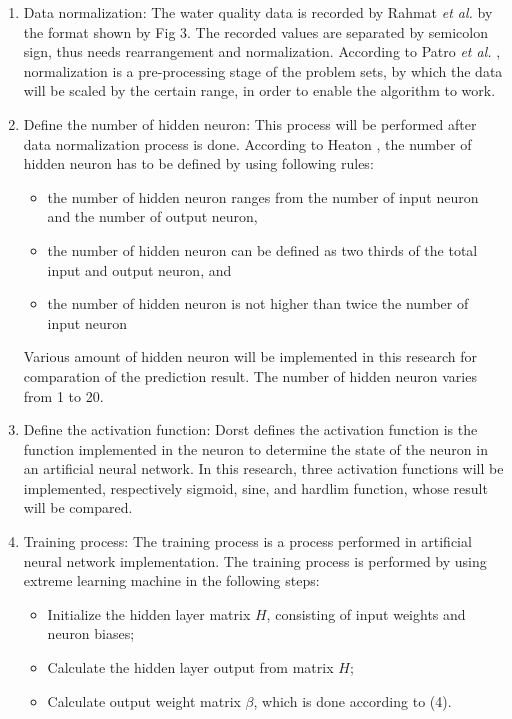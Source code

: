 \documentclass[journal,comsoc]{IEEEtran}
\begin{document}
\begin{enumerate}

\item Data normalization: The water quality data is recorded by Rahmat {\it et al.} \cite{Rahmat16} by the format shown by Fig 3. The recorded values are separated by semicolon sign, thus needs rearrangement and normalization. According to Patro {\it et al.} \cite{Patro15} , normalization is a pre-processing stage of the problem sets, by which the data will be scaled by the certain range, in order to enable the algorithm to work.

\item Define the number of hidden neuron: This process will be performed after data normalization process is done. According to Heaton \cite{Heaton08} , the number of hidden neuron has to be defined by using following rules:

\begin{itemize}
\item the number of hidden neuron ranges from the number of input neuron and the number of output neuron,
\item the number of hidden neuron can be defined as two thirds of the total input and output neuron, and
\item the number of hidden neuron is not higher than twice the number of input neuron
\end{itemize}

Various amount of hidden neuron will be implemented in this research for comparation of the prediction result. The number of hidden neuron varies from 1 to 20.

\item Define the activation function: Dorst \cite{Dorst16} defines the activation function is the function implemented in the neuron to determine the state of the neuron in an artificial neural network. In this research, three activation functions will be implemented, respectively sigmoid, sine, and hardlim function, whose result will be compared.

\item Training process: The training process is a process performed in artificial neural network implementation. The training process is performed by using extreme learning machine in the following steps:

\begin{itemize}
\item Initialize the hidden layer matrix $H$, consisting of input weights and neuron biases;
\item Calculate the hidden layer output from matrix $H$;
\item Calculate output weight matrix $\beta$, which is done according to (4).
\end{itemize}


\end{enumerate}
\end{document}
